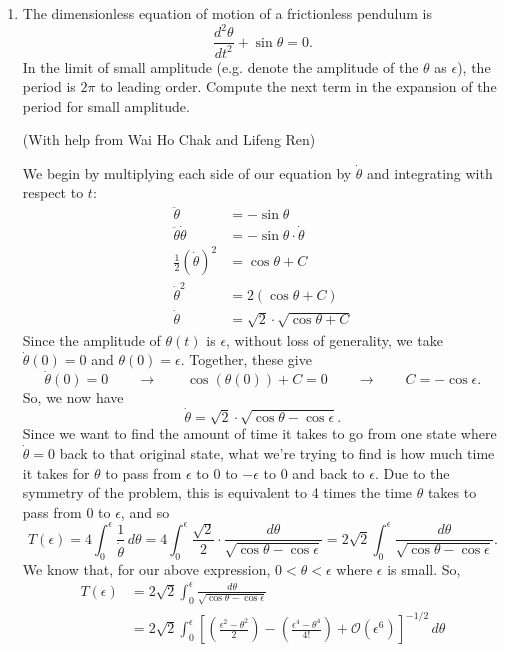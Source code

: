 \documentclass[10pt,letterpaper]{report}
\newcommand{\so}{\qquad \rightarrow \qquad}
\newcommand{\Ord}[1]{\mathcal{O}\left({#1}\right)}
\begin{document}
\begin{enumerate}
\addtocounter{enumi}{1}

\item \begin{qbox}
The dimensionless equation of motion of a frictionless pendulum is
\[
\frac{d^2\theta}{dt^2} + \sin\theta = 0.
\]
In the limit of small amplitude (e.g. denote the amplitude of the $\theta$ as $\epsilon$), the period is $2\pi$ to leading order. Compute the next term in the expansion of the period for small amplitude.
\end{qbox}

(With help from Wai Ho Chak and Lifeng Ren)

We begin by multiplying each side of our equation by $\dot \theta$ and integrating with respect to $t$:
\begin{align*}
    \ddot \theta &= -\sin\theta \\
    \ddot\theta\dot\theta &= -\sin\theta\cdot \dot\theta \\
    \frac{1}{2}\left(\dot\theta\right)^2 &= \cos\theta + C \\
    \dot\theta^2 &= 2\left(\cos\theta + C\right)
    \\
    \dot\theta &= \sqrt 2 \cdot \sqrt{\cos\theta + C}
\end{align*}
Since the amplitude of $\theta(t)$ is $\epsilon$, without loss of generality, we take $\dot \theta(0) = 0$ and $\theta(0) = \epsilon$. Together, these give
\[
\dot\theta(0) = 0 \so \cos(\theta(0)) + C = 0 \so C = -\cos \epsilon.
\]
So, we now have
\[
\dot\theta = \sqrt 2 \cdot \sqrt{\cos\theta -\cos \epsilon}.
\]
Since we want to find the amount of time it takes to go from one state where $\dot \theta = 0$ back to that original state, what we're trying to find is how much time it takes for $\theta$ to pass from $\epsilon$ to $0$ to $-\epsilon$ to $0$ and back to $\epsilon$. Due to the symmetry of the problem, this is equivalent to 4 times the time $\theta$ takes to pass from $0$ to $\epsilon$, and so
\[
T(\epsilon) = 4\int_0^{\epsilon}\frac{1}{\dot \theta}\,d\theta = 4\int_0^\epsilon \frac{\sqrt{2}}{2}\cdot \frac{d\theta}{\sqrt{\cos\theta - \cos \epsilon}} = 2\sqrt 2 \int_0^\epsilon \frac{d\theta}{\sqrt{\cos\theta - \cos \epsilon}}.
\]
We know that, for our above expression, $0 < \theta < \epsilon$ where $\epsilon$ is small. So,
\begin{align*}
    T(\epsilon)
    &=
    2 \sqrt 2 \int_0^\epsilon \frac{d\theta}{\sqrt{\cos\theta - \cos \epsilon}}
    \\
    &=
    2 \sqrt 2 \int_0^\epsilon \left[\left(\frac{\epsilon^2 - \theta^2}{2}\right) - \left(\frac{\epsilon^4 - \theta^4}{4!}\right) + \Ord{\epsilon^6}\right]^{-1/2}\,d\theta

\end{align*}
\end{enumerate}
\end{document}
